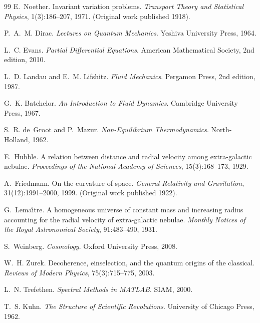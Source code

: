 \documentclass[11pt,oneside]{book}
\begin{document}
\begin{thebibliography}{99}
E.~Noether.
\newblock Invariant variation problems.
\newblock \emph{Transport Theory and Statistical Physics}, 1(3):186--207, 1971.
\newblock (Original work published 1918).

P.~A.~M. Dirac.
\newblock \emph{Lectures on Quantum Mechanics}.
\newblock Yeshiva University Press, 1964.

L.~C. Evans.
\newblock \emph{Partial Differential Equations}.
\newblock American Mathematical Society, 2nd edition, 2010.

L.~D. Landau and E.~M. Lifshitz.
\newblock \emph{Fluid Mechanics}.
\newblock Pergamon Press, 2nd edition, 1987.

G.~K. Batchelor.
\newblock \emph{An Introduction to Fluid Dynamics}.
\newblock Cambridge University Press, 1967.

S.~R. de~Groot and P.~Mazur.
\newblock \emph{Non-Equilibrium Thermodynamics}.
\newblock North-Holland, 1962.

E.~Hubble.
\newblock A relation between distance and radial velocity among extra-galactic
nebulae.
\newblock \emph{Proceedings of the National Academy of Sciences},
15(3):168--173, 1929.

A.~Friedmann.
\newblock On the curvature of space.
\newblock \emph{General Relativity and Gravitation}, 31(12):1991--2000, 1999.
\newblock (Original work published 1922).

G.~Lema\^{\i}tre.
\newblock A homogeneous universe of constant mass and increasing radius
accounting for the radial velocity of extra-galactic nebulae.
\newblock \emph{Monthly Notices of the Royal Astronomical Society},
91:483--490, 1931.

S.~Weinberg.
\newblock \emph{Cosmology}.
\newblock Oxford University Press, 2008.

W.~H. Zurek.
\newblock Decoherence, einselection, and the quantum origins of the classical.
\newblock \emph{Reviews of Modern Physics}, 75(3):715--775, 2003.

L.~N. Trefethen.
\newblock \emph{Spectral Methods in MATLAB}.
\newblock SIAM, 2000.

T.~S. Kuhn.
\newblock \emph{The Structure of Scientific Revolutions}.
\newblock University of Chicago Press, 1962.

\end{thebibliography}
\end{document}
